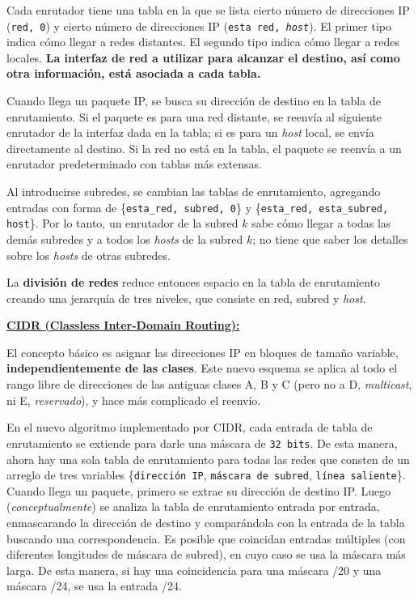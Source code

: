 \documentclass[10pt,a4paper]{article}
\begin{document}
Cada enrutador tiene una tabla en la que se lista cierto número de direcciones IP (\texttt{red, 0}) y cierto número de direcciones IP (\texttt{esta red, \textit{host}}). El primer tipo indica cómo llegar a redes distantes. El segundo tipo indica cómo llegar a redes locales. \textbf{La interfaz de red a utilizar para alcanzar el destino, así como otra información, está asociada a cada tabla.}

Cuando llega un paquete IP, se busca su dirección de destino en la tabla de enrutamiento. Si el paquete es para una red distante, se reenvía al siguiente enrutador de la interfaz dada en la tabla; si es para un \textit{host} local, se envía directamente al destino. Si la red no está en la tabla, el paquete se reenvía a un enrutador predeterminado con tablas más extensas.

Al introducirse subredes, se cambian las tablas de enrutamiento, agregando entradas con forma de \{\texttt{esta\_red, subred, 0}\} y \{\texttt{esta\_red, esta\_subred, host}\}. Por lo tanto, un enrutador de la subred $k$ sabe cómo llegar a todas las demás subredes y a todos los \textit{hosts} de la subred $k$; no tiene que saber los detalles sobre los \textit{hosts} de otras subredes.

La \textbf{división de redes} reduce entonces espacio en la tabla de enrutamiento creando una jerarquía de tres niveles, que consiste en red, subred y \textit{host}.

\underline{\textbf{CIDR (Classless Inter-Domain Routing):}}

El concepto básico es asignar las direcciones IP en bloques de tamaño variable, \textbf{independientemente de las clases}. Este nuevo esquema se aplica al todo el rango libre de direcciones de las antiguas clases A, B y C (pero no a D, \textit{multicast}, ni E, \textit{reservado}), y hace más complicado el reenvío.

En el nuevo algoritmo implementado por CIDR, cada entrada de tabla de enrutamiento se extiende para darle una máscara de \texttt{32 bits}. De esta manera, ahora hay una sola tabla de enrutamiento para todas las redes que consten de un arreglo de tres variables \{\texttt{dirección IP}, \texttt{máscara de subred}, \texttt{línea saliente}\}. Cuando llega un paquete, primero se extrae su dirección de destino IP. Luego (\textit{conceptualmente}) se analiza la tabla de enrutamiento entrada por entrada, enmascarando la dirección de destino y comparándola con la entrada de la tabla buscando una correspondencia. Es posible que coincidan entradas múltiples (con diferentes longitudes de máscara de subred), en cuyo caso se usa la máscara más larga. De esta manera, si hay una coincidencia para una máscara /20 y una máscara /24, se usa la entrada /24.
\end{document}
